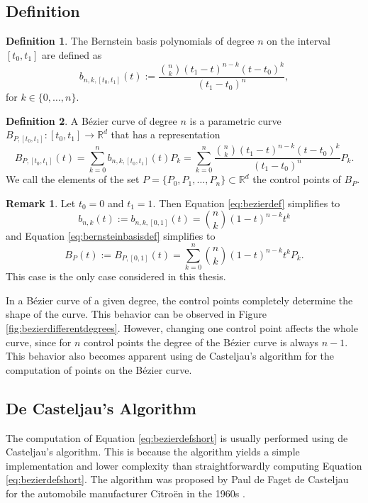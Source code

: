 \documentclass[a4paper, 11pt]{report}
\theoremstyle{definition}
\newtheorem{definition}{Definition}[section]
\newtheorem*{remark}{Remark}
\begin{document}
\subsection{Definition}
	\begin{definition}
		The Bernstein basis polynomials of degree $n$ on the interval $[t_0,t_1]$ are defined as
		\begin{equation}\label{eq:bernsteinbasisdef}
			b_{n,k,[t_0, t_1]}(t) := \frac{\binom{n}{k} (t_1-t)^{n-k}(t-t_0)^k}{(t_1-t_0)^n},
		\end{equation}
		for $k \in \{0,\dots, n\}$.
	\end{definition}

	\begin{definition}
		A Bézier curve of degree $n$ is a parametric curve $B_{P,[t_0, t_1]}: [t_0, t_1] \rightarrow \mathbb{R}^d$ that has a representation
		\begin{equation}\label{eq:bezierdef}
			B_{P, [t_0, t_1]}(t) = \sum_{k=0}^n b_{n,k,[t_0, t_1]}(t) P_k = \sum_{k=0}^n \frac{\binom{n}{k} (t_1-t)^{n-k}(t-t_0)^k}{(t_1-t_0)^n} P_k.
		\end{equation}
		We call the elements of the set $P = \{P_0, P_1, \dots, P_n\} \subset \mathbb{R}^d$ the control points of $B_P$.
	\end{definition}

	\begin{remark}
		Let $t_0 = 0$ and $t_1 = 1$. Then Equation \ref{eq:bezierdef} simplifies to
		\begin{equation*}
			b_{n,k}(t) := b_{n,k,[0,1]}(t) = \binom{n}{k} (1-t)^{n-k}t^k
		\end{equation*}
		and Equation \ref{eq:bernsteinbasisdef} simplifies to
		\begin{equation}\label{eq:bezierdefshort}
			B_P(t) := B_{P,[0,1]}(t)= \sum_{k=0}^n \binom{n}{k} (1-t)^{n-k}t^k P_k.
		\end{equation}
		This case is the only case considered in this thesis.
	\end{remark}

	In a Bézier curve of a given degree, the control points completely determine the shape of the curve. This behavior can be observed in Figure \ref{fig:bezierdifferentdegrees}. However, changing one control point affects the whole curve, since for $n$ control points the degree of the Bézier curve is always $n-1$. This behavior also becomes apparent using de Casteljau's algorithm for the computation of points on the Bézier curve.

\subsection{De Casteljau's Algorithm}
	The computation of Equation \ref{eq:bezierdefshort} is usually performed using de Casteljau's algorithm. This is because the algorithm yields a simple implementation and lower complexity than straightforwardly computing Equation \ref{eq:bezierdefshort}. The algorithm was proposed by Paul de Faget de Casteljau for the automobile manufacturer Citroën in the 1960s \cite{Boehm1999}.
\end{document}
